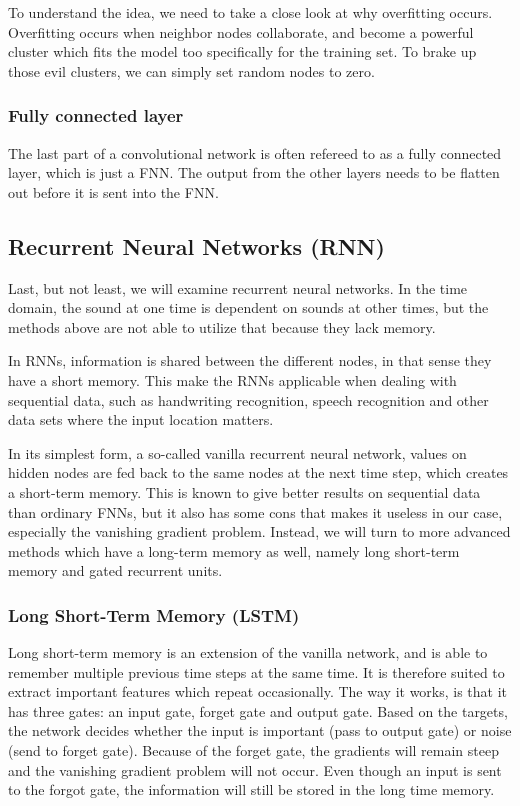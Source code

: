 To understand the idea, we need to take a close look at why overfitting occurs. Overfitting occurs when neighbor nodes collaborate, and become a powerful cluster which fits the model too specifically for the training set. To brake up those evil clusters, we can simply set random nodes to zero. \cite{Dropout}

\subsubsection*{Fully connected layer}
The last part of a convolutional network is often refereed to as a fully connected layer, which is just a FNN. The output from the other layers needs to be flatten out before it is sent into the FNN.

\subsection{Recurrent Neural Networks (RNN)}
Last, but not least, we will examine recurrent neural networks. In the time domain, the sound at one time is dependent on sounds at other times, but the methods above are not able to utilize that because they lack memory. 

In RNNs, information is shared between the different nodes, in that sense they have a short memory. This make the RNNs applicable when dealing with sequential data, such as handwriting recognition, speech recognition and other data sets where the input location matters. 

In its simplest form, a so-called vanilla recurrent neural network, values on hidden nodes are fed back to the same nodes at the next time step, which creates a short-term memory. This is known to give better results on sequential data than ordinary FNNs, but it also has some cons that makes it useless in our case, especially the vanishing gradient problem. Instead, we will turn to more advanced methods which have a long-term memory as well, namely long short-term memory and gated recurrent units.

\subsubsection*{Long Short-Term Memory (LSTM)}
Long short-term memory is an extension of the vanilla network, and is able to remember multiple previous time steps at the same time. It is therefore suited to extract important features which repeat occasionally. The way it works, is that it has three gates: an input gate, forget gate and output gate. Based on the targets, the network decides whether the input is important (pass to output gate) or noise (send to forget gate). Because of the forget gate, the gradients will remain steep and the vanishing gradient problem will not occur. Even though an input is sent to the forgot gate, the information will still be stored in the long time memory. \cite{lstm}

